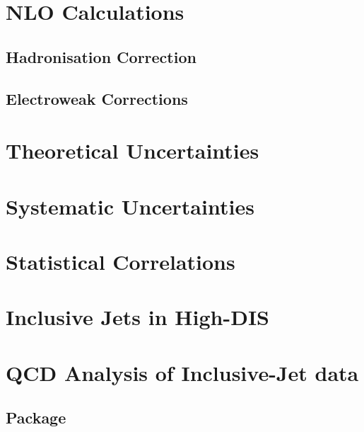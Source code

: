 \section{NLO Calculations}
\label{sec:nlopredictions}


\subsection{Hadronisation Correction}

% 
\subsection{Electroweak Corrections}


\section{Theoretical Uncertainties}
\label{sec:nlouncertainty}


\section{Systematic Uncertainties}
\label{subsec:systunc}


\section{Statistical Correlations}
\label{subsec:statcorel}


\section{Inclusive Jets in High-\qsq DIS}
\label{sec:incljetsncdis}


\newpage
\section{QCD Analysis of Inclusive-Jet data}
\label{sec:aspdffit}


\subsection{\herafitter Package}
\label{subsec:herfitter}


